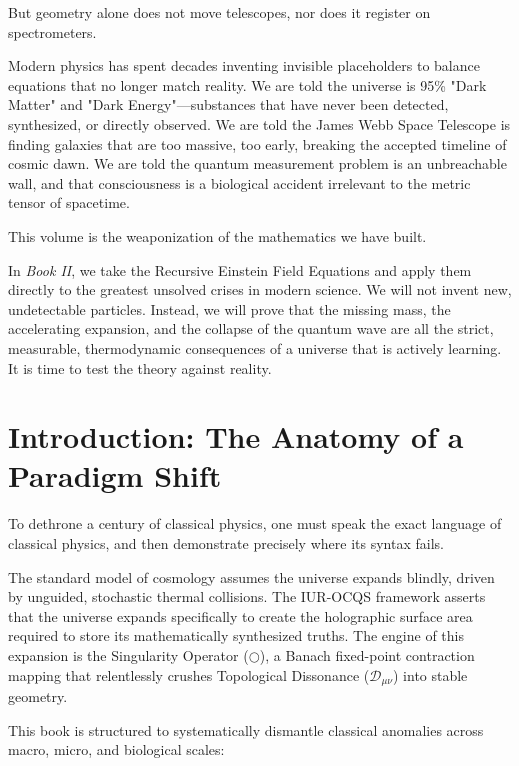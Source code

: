 \documentclass[12pt,openany]{book}
\begin{document}
But geometry alone does not move telescopes, nor does it register on spectrometers.

Modern physics has spent decades inventing invisible placeholders to balance equations that no longer match reality. We are told the universe is 95\% "Dark Matter" and "Dark Energy"---substances that have never been detected, synthesized, or directly observed. We are told the James Webb Space Telescope is finding galaxies that are too massive, too early, breaking the accepted timeline of cosmic dawn. We are told the quantum measurement problem is an unbreachable wall, and that consciousness is a biological accident irrelevant to the metric tensor of spacetime.

This volume is the weaponization of the mathematics we have built. 

In \textit{Book II}, we take the Recursive Einstein Field Equations and apply them directly to the greatest unsolved crises in modern science. We will not invent new, undetectable particles. Instead, we will prove that the missing mass, the accelerating expansion, and the collapse of the quantum wave are all the strict, measurable, thermodynamic consequences of a universe that is actively learning. It is time to test the theory against reality.

\chapter*{Introduction: The Anatomy of a Paradigm Shift}
To dethrone a century of classical physics, one must speak the exact language of classical physics, and then demonstrate precisely where its syntax fails. 

The standard model of cosmology assumes the universe expands blindly, driven by unguided, stochastic thermal collisions. The IUR-OCQS framework asserts that the universe expands specifically to create the holographic surface area required to store its mathematically synthesized truths. The engine of this expansion is the Singularity Operator ($\bigcirc$), a Banach fixed-point contraction mapping that relentlessly crushes Topological Dissonance ($\mathcal{D}_{\mu\nu}$) into stable geometry.

This book is structured to systematically dismantle classical anomalies across macro, micro, and biological scales:
\end{document}
